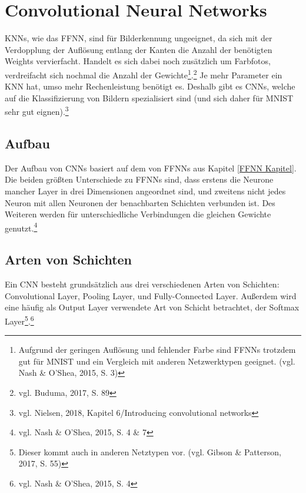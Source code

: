 \documentclass[a4paper,12pt,ngerman,oneside]{scrreprt}	%
\newcommand{\practitioner}[1]{vgl. Gibson \& Patterson, 2017, S. {#1}}
\newcommand{\fundamentals}[1]{vgl. Buduma, 2017, S. {#1}}
\newcommand{\cnnKlein}[1]{vgl. Nash \& O'Shea, 2015, S. {#1}}
\begin{document}
	\chapter{Convolutional Neural Networks}\label{CNN Kapitel}
	KNNs, wie das FFNN, sind für Bilderkennung ungeeignet, da sich mit der Verdopplung der Auflösung entlang der Kanten die Anzahl der benötigten Weights vervierfacht. Handelt es sich dabei noch zusätzlich um Farbfotos, verdreifacht sich nochmal die Anzahl der Gewichte\footnote{Aufgrund der geringen Auflösung und fehlender Farbe sind FFNNs trotzdem gut für MNIST und ein Vergleich mit anderen Netzwerktypen geeignet. (\cnnKlein{3})}.\footnote{\fundamentals{89}} Je mehr Parameter ein KNN hat, umso mehr Rechenleistung benötigt es. Deshalb gibt es CNNs, welche auf die Klassifizierung von Bildern spezialisiert sind (und sich daher für MNIST sehr gut eignen).\footnote{vgl. Nielsen, 2018, Kapitel 6/Introducing convolutional networks}
	
	
		\section{Aufbau}
		Der Aufbau von CNNs basiert auf dem von FFNNs aus Kapitel \ref{FFNN Kapitel}. Die beiden größten Unterschiede zu FFNNs sind, dass erstens die Neurone mancher Layer in drei Dimensionen angeordnet sind, und zweitens nicht jedes Neuron mit allen Neuronen der benachbarten Schichten verbunden ist. Des Weiteren werden für unterschiedliche Verbindungen die gleichen Gewichte genutzt.\footnote{\cnnKlein{4 \& 7}}
		
			
		\section{Arten von Schichten}
		 Ein CNN besteht grundsätzlich aus drei verschiedenen Arten von Schichten: Convolutional Layer, Pooling Layer, und Fully-Connected Layer. Außerdem wird eine häufig als Output Layer verwendete Art von Schicht betrachtet, der Softmax Layer\footnote{Dieser kommt auch in anderen Netztypen vor. (\practitioner{55})}.\footnote{\cnnKlein{4}}
		 
\end{document}
